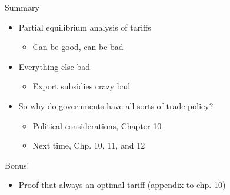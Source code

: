 \documentclass{beamer}
\begin{document}


\begin{frame}{Summary}
    \begin{itemize}
        \item Partial equilibrium analysis of tariffs
        \begin{itemize}
            \item Can be good, can be bad
        \end{itemize}
        \item Everything else bad
        \begin{itemize}
            \item Export subsidies crazy bad
        \end{itemize}
        \item So why do governments have all sorts of trade policy?
        \begin{itemize}
            \item Political considerations, Chapter 10
            \item Next time, Chp. 10, 11, and 12
        \end{itemize}
    \end{itemize}
\end{frame}

\begin{frame}{Bonus!}
    \begin{itemize}
        \item Proof that always an optimal tariff (appendix to chp. 10)
    \end{itemize}
\end{frame}
\end{document}
